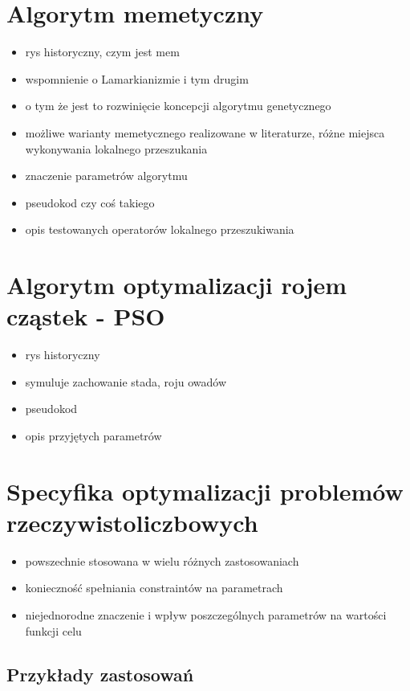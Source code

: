 \section{Algorytm memetyczny}
\begin{itemize}
\item rys historyczny, czym jest mem
\item wspomnienie o Lamarkianizmie i tym drugim
\item o tym że jest to rozwinięcie koncepcji algorytmu genetycznego
\item możliwe warianty memetycznego realizowane w literaturze, różne miejsca wykonywania lokalnego przeszukania
\item znaczenie parametrów algorytmu
\item pseudokod czy coś takiego
\item opis testowanych operatorów lokalnego przeszukiwania
\end{itemize}

\section{Algorytm optymalizacji rojem cząstek - PSO}
\begin{itemize}
\item rys historyczny
\item symuluje zachowanie stada, roju owadów
\item pseudokod
\item opis przyjętych parametrów
\end{itemize}

\section{Specyfika optymalizacji problemów rzeczywistoliczbowych}
\begin{itemize}
\item powszechnie stosowana w wielu różnych zastosowaniach
\item konieczność spełniania constraintów na parametrach
\item niejednorodne znaczenie i wpływ poszczególnych parametrów na wartości funkcji celu
\end{itemize}

\subsection{Przykłady zastosowań}